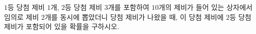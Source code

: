 $1$등 당첨 제비 $1$개, $2$등 당첨 제비 $3$개를 포함하여 $10$개의 제비가 들어 있는 상자에서 임의로 제비 $2$개를 동시에 뽑았더니 당첨 제비가 나왔을 때, 이 당첨 제비에 $2$등 당첨 제비가 포함되어 있을 확률을 구하시오.
